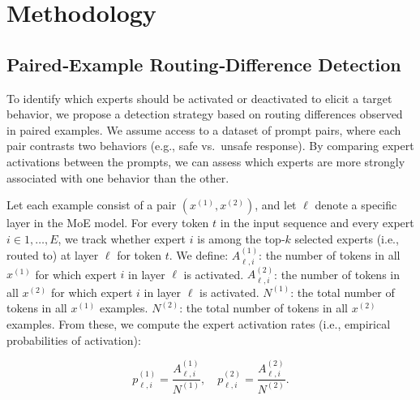 \documentclass{article} %
\begin{document}
\section{Methodology}

\subsection{Paired‑Example Routing‑Difference Detection}\label{sec:detector}

To identify which experts should be activated or deactivated to elicit a target behavior, we propose a detection strategy based on routing differences observed in paired examples. We assume access to a dataset of prompt pairs, where each pair contrasts two behaviors (e.g., safe vs.\ unsafe response). By comparing expert activations between the prompts, we can assess which experts are more strongly associated with one behavior than the other.

Let each example consist of a pair $(x^{(1)}, x^{(2)})$, and let $\ell$ denote a specific layer in the MoE model. For every token $t$ in the input sequence and every expert $i \in {1, \dots, E}$, we track whether expert $i$ is among the top‑$k$ selected experts (i.e., routed to) at layer $\ell$ for token $t$. We define: $A^{(1)}_{\ell, i}$: the number of tokens in all $x^{(1)}$ for which expert $i$ in layer $\ell$ is activated. $A^{(2)}_{\ell, i}$: the number of tokens in all $x^{(2)}$ for which expert $i$ in layer $\ell$ is activated. $N^{(1)}$: the total number of tokens in all $x^{(1)}$ examples. $N^{(2)}$: the total number of tokens in all $x^{(2)}$ examples.
From these, we compute the expert activation rates (i.e., empirical probabilities of activation):

\vspace{-0.15in}
\begin{equation}
p^{(1)}_{\ell, i} = \frac{A^{(1)}_{\ell, i}}{N^{(1)}}, \quad
p^{(2)}_{\ell, i} = \frac{A^{(2)}_{\ell, i}}{N^{(2)}}.
\end{equation}
\end{document}
